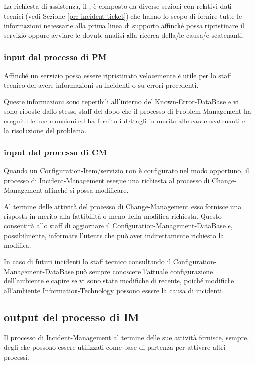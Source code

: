 La richiesta di assistenza, il , è composto da diverse sezioni con relativi dati tecnici (vedi Sezione \ref{prc-incident-ticket}) che hanno lo scopo di fornire tutte le informazioni necessarie alla prima linea di supporto affinché possa ripristinare il servizio oppure avviare le dovute analisi alla ricerca della/le causa/e scatenanti.

\subsubsection[Input dal processo di PM]{input dal processo di PM}
Affinché un servizio possa essere ripristinato velocemente è utile per lo staff tecnico del  avere informazioni su incidenti o su errori precedenti.

Queste informazioni sono reperibili all'interno del \ac{Known-Error-DataBase} e vi sono riposte dallo stesso staff del  dopo che il processo di \ac{Problem-Management} ha eseguito le sue mansioni ed ha fornito i dettagli in merito alle cause scatenanti e la risoluzione del problema.

\subsubsection[Input dal processo di CM]{input dal processo di CM}
Quando un \ac{Configuration-Item}/servizio non è configurato nel modo opportuno, il processo di \ac{Incident-Management} esegue una richiesta al processo di \ac{Change-Management} affinché si possa modificare.

Al termine delle attività del processo di \ac{Change-Management} esso fornisce una risposta in merito alla fattibilità o meno della modifica richiesta. Questo consentirà allo staff di aggiornare il \ac{Configuration-Management-DataBase} e, possibilmente, informare l'utente che può aver indirettamente richiesto la modifica.

In caso di futuri incidenti lo staff tecnico consultando il \ac{Configuration-Management-DataBase} può sempre conoscere l'attuale configurazione dell'ambiente e capire se vi sono state modifiche di recente, poiché modifiche all'ambiente \acs{Information-Technology} possono essere la causa di incidenti.

\subsection[Output del processo di IM]{output del processo di IM}
\label{prc-incident-output}
Il processo di \ac{Incident-Management} al termine delle sue attività fornisce, sempre, degli  che possono essere utilizzati come base di partenza per attivare altri processi.

